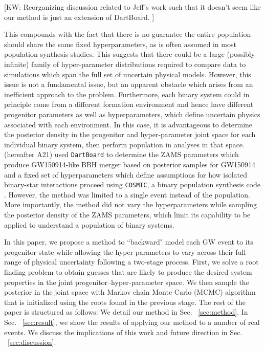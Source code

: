 \documentclass[twocolumn]{aastex631}
\newcommand{\kw}[1]{{\color{rb4}[KW: #1 ]}}
\begin{document}
\kw{Reorganizing discussion related to Jeff's work such that it doesn't seem like our method is just an extension of DartBoard.}

This compounds with the fact that there is no guarantee the entire population should share the same fixed hyperparameters, 
as is often assumed in most population synthesis studies.
This suggests that there could be a large (possibly infinite) family of hyper-parameter distributions 
required to compare data to simulations which span the full set of uncertain physical models.
However, this issue is not a fundamental issue, but an apparent obstacle which arises from an inefficient approach to the problem.
Furthermore, each binary system could in principle come from a different formation environment and hence 
have different progenitor parameters as well as hyperparameters, which define uncertain physics associated with each environment.
In this case, it is advantageous to determine the posterior density in the progenitor and hyper-parameter joint space 
for each individual binary system, then perform population in analyses in that space.
\citet{Andrews2021} (hereafter A21) used \texttt{DartBoard} \citep{Andrews2018} 
to determine the ZAMS parameters which produce GW150914-like BBH merger based on posterior samples for GW150914 and a fixed 
set of hyperparameters which define assumptions for how isolated binary-star interactions proceed using 
\texttt{COSMIC}, a binary population synthesis code \citep{Breivik2020}.
However, the method was limited to a single event instead of the population.
More importantly, the method did not vary the hyperparameters while sampling the posterior density of the ZAMS parameters,
which limit its capability to be applied to understand a population of binary systems.

In this paper, we propose a method to ``backward" model each GW event to its progenitor state 
while allowing the hyper-parameters to vary across their full range of physical uncertainty
following a two-stage process.
First, we solve a root finding problem to obtain guesses that are likely to produce the desired system properties in the joint progenitor--hyper-parameter space.
We then sample the posterior in the joint space with Markov chain Monte Carlo (MCMC) algorithm that is initialized using the roots found in the previous stage.
The rest of the paper is structured as follows: We detail our method in Sec. ~\ref{sec:method}.
In Sec. ~\ref{sec:result}, we show the results of applying our method to a number of real events.
We discuss the implications of this work and future direction in Sec. ~\ref{sec:discussion}.
\end{document}
